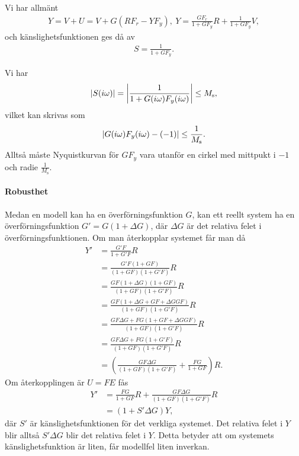 Vi har allmänt
\begin{align*}
	Y = V + U = V + G(RF_{r} - YF_{y}),\ Y = \frac{GF_{r}}{1 + GF_{y}}R + \frac{1}{1 + GF_{y}}V,
\end{align*}
och känslighetsfunktionen ges då av
\begin{align*}
	S = \frac{1}{1 + GF_{y}}.
\end{align*}

Vi har
\begin{align*}
	\abs{S(i\omega)} = \abs{\frac{1}{1 + G(i\omega)F_{y}(i\omega)}} \leq M_{\text{s}},
\end{align*}
vilket kan skrivas som
\begin{align*}
	\abs{G(i\omega)F_{y}(i\omega) - (-1)} \leq \frac{1}{M_{\text{s}}}.
\end{align*}
Alltså måste Nyquistkurvan för $GF_{y}$ vara utanför en cirkel med mittpukt i $-1$ och radie $\frac{1}{M_{\text{s}}}$.

\paragraph{Robusthet}
Medan en modell kan ha en överförningsfunktion $G$, kan ett reellt system ha en överförningsfunktion $G' = G(1 + \Delta G)$, där $\Delta G$ är det relativa felet i överförningsfunktionen. Om man återkopplar systemet får man då
\begin{align*}
	Y' &= \frac{G'F}{1 + G'F}R \\
	   &= \frac{G'F(1 + GF)}{(1 + GF)(1 + G'F)}R \\
	   &= \frac{GF(1 + \Delta G)(1 + GF)}{(1 + GF)(1 + G'F)}R \\
	   &= \frac{GF(1 + \Delta G + GF + \Delta GGF)}{(1 + GF)(1 + G'F)}R \\
	   &= \frac{GF\Delta G + FG(1 + GF + \Delta GGF)}{(1 + GF)(1 + G'F)}R \\
	   &= \frac{GF\Delta G + FG(1 + G'F)}{(1 + GF)(1 + G'F)}R \\
	   &= \left(\frac{GF\Delta G}{(1 + GF)(1 + G'F)} + \frac{FG}{1 + GF}\right)R.
\end{align*}
Om återkopplingen är $U = FE$ fås
\begin{align*}
	Y' &= \frac{FG}{1 + GF}R + \frac{GF\Delta G}{(1 + GF)(1 + G'F)}R \\
	   &= (1 + S'\Delta G)Y,
\end{align*}
där $S'$ är känslighetsfunktionen för det verkliga systemet. Det relativa felet i $Y$ blir alltså $S'\Delta G$ blir det relativa felet i $Y$. Detta betyder att om systemets känslighetsfunktion är liten, får modellfel liten inverkan.

